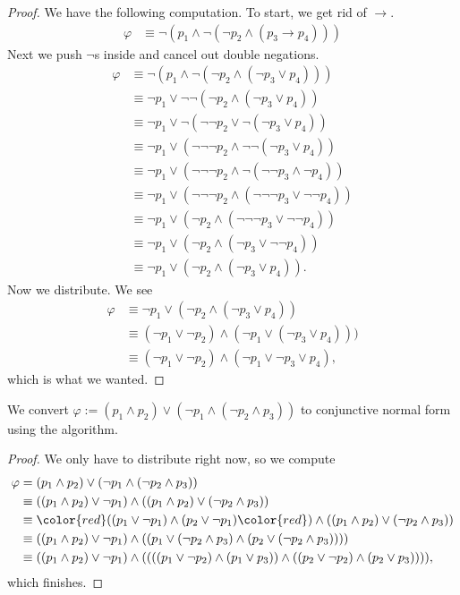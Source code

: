 \documentclass[../notes.tex]{subfiles}
\begin{document}
\begin{proof}
	We have the following computation. To start, we get rid of $\to$.
	\begin{align*}
		\varphi &\equiv\lnot(p_1\land\lnot(\lnot p_2\land(p_3\to p_4)))
	\end{align*}
	Next we push $\lnot$s inside and cancel out double negations.
	\begin{align*}
		\varphi &\equiv\lnot(p_1\land\lnot(\lnot p_2\land(\lnot p_3\lor p_4))) \\
		&\equiv\lnot p_1\lor\lnot\lnot(\lnot p_2\land(\lnot p_3\lor p_4)) \\
		&\equiv\lnot p_1\lor\lnot(\lnot\lnot p_2\lor\lnot(\lnot p_3\lor p_4)) \\
		&\equiv\lnot p_1\lor(\lnot\lnot\lnot p_2\land\lnot\lnot(\lnot p_3\lor p_4)) \\
		&\equiv\lnot p_1\lor(\lnot\lnot\lnot p_2\land\lnot(\lnot\lnot p_3\land \lnot p_4)) \\
		&\equiv\lnot p_1\lor(\lnot\lnot\lnot p_2\land(\lnot\lnot\lnot p_3\lor \lnot\lnot p_4)) \\
		&\equiv\lnot p_1\lor(\lnot p_2\land(\lnot\lnot\lnot p_3\lor \lnot\lnot p_4)) \\
		&\equiv\lnot p_1\lor(\lnot p_2\land(\lnot p_3\lor \lnot\lnot p_4)) \\
		&\equiv\lnot p_1\lor(\lnot p_2\land(\lnot p_3\lor p_4)).
	\end{align*}
	Now we distribute. We see
	\begin{align*}
		\varphi & \equiv\lnot p_1\lor(\lnot p_2\land(\lnot p_3\lor p_4)) \\
		& \equiv(\lnot p_1\lor\lnot p_2)\land(\lnot p_1\lor(\lnot p_3\lor p_4))) \\
		& \equiv\boxed{(\lnot p_1\lor\lnot p_2)\land(\lnot p_1\lor\lnot p_3\lor p_4)},
	\end{align*}
	which is what we wanted.
\end{proof}
\begin{exe}
	We convert $\varphi:=(p_1\land p_2)\lor(\lnot p_1\land(\lnot p_2\land p_3))$ to conjunctive normal form using the algorithm.
\end{exe}
\begin{proof}
	We only have to distribute right now, so we compute
	\begin{align*}
		\varphi &= (p_1\land p_2)\lor(\lnot p_1\land(\lnot p_2\land p_3)) \\
		&\equiv ((p_1\land p_2)\lor\lnot p_1)\land((p_1\land p_2)\lor(\lnot p_2\land p_3)) \\
		&\equiv {\color{red}(}(p_1\lor\lnot p_1)\land(p_2\lor\lnot p_1){\color{red})}\land((p_1\land p_2)\lor(\lnot p_2\land p_3)) \\
		&\equiv ((p_1\land p_2)\lor\lnot p_1)\land((p_1\lor(\lnot p_2\land p_3)\land( p_2\lor(\lnot p_2\land p_3)))) \\
		&\equiv ((p_1\land p_2)\lor\lnot p_1)\land((((p_1\lor\lnot p_2)\land (p_1\lor p_3))\land( (p_2\lor\lnot p_2)\land(p_2\lor p_3)))),
	\end{align*}
	which finishes.
\end{proof}
\end{document}
